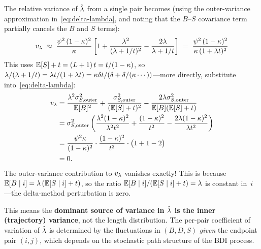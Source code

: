 The relative variance of $\hat{\lambda}$ from a single pair becomes
(using the outer-variance approximation in~\eqref{eq:delta-lambda},
and noting that the $B$--$S$ covariance
term partially cancels the $B$ and $S$ terms):
\begin{equation}\label{eq:v-lambda-closed}
v_\lambda \;\approx\;
  \frac{\psi^2\,(1-\kappa)^2}{\kappa}
  \left[
    1
    + \frac{\lambda^2}{(\lambda + 1/t)^2}
    - \frac{2\lambda}{\lambda + 1/t}
  \right]
  \;=\;
  \frac{\psi^2\,(1-\kappa)^2}{\kappa\,(1+\lambda t)^2}
\end{equation}
This uses $\mathbb{E}[S] + t = (L+1)\,t = t/(1-\kappa)$,
so $\lambda/(\lambda + 1/t) = \lambda t/(1+\lambda t) = \kappa\delta t/(\delta + \delta/(\kappa\cdots))$---more
directly, substitute into~\eqref{eq:delta-lambda}:
\begin{align*}
v_\lambda &= \frac{\lambda^2\sigma^2_{S,\text{outer}}}{\mathbb{E}[B]^2}
  + \frac{\sigma^2_{S,\text{outer}}}{(\mathbb{E}[S]+t)^2}
  - \frac{2\lambda\sigma^2_{S,\text{outer}}}{\mathbb{E}[B](\mathbb{E}[S]+t)} \\
  &= \sigma^2_{S,\text{outer}}
     \left(
       \frac{\lambda^2(1-\kappa)^2}{\lambda^2t^2}
       + \frac{(1-\kappa)^2}{t^2}
       - \frac{2\lambda(1-\kappa)^2}{\lambda t^2}
     \right) \\
  &= \frac{\psi^2\kappa}{(1-\kappa)^2}
     \cdot \frac{(1-\kappa)^2}{t^2}
     \cdot \bigl(1 + 1 - 2\bigr) \\
  &= 0.
\end{align*}
The outer-variance contribution to $v_\lambda$ vanishes exactly!
This is because $\mathbb{E}[B \mid i] = \lambda\,(\mathbb{E}[S \mid i] + t)$,
so the ratio $\mathbb{E}[B \mid i]/(\mathbb{E}[S \mid i] + t) = \lambda$
is constant in~$i$---the delta-method perturbation is zero.

This means the \textbf{dominant source of variance in $\hat{\lambda}$
is the inner (trajectory) variance}, not the length distribution.
The per-pair coefficient of variation of $\hat{\lambda}$ is determined
by the fluctuations in $(B, D, S)$ \emph{given} the endpoint pair
$(i, j)$, which depends on the stochastic path structure of the
BDI process.


